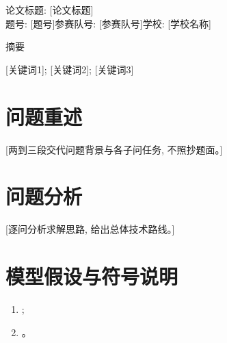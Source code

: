 \documentclass[zihao=-4,a4paper]{ctexart}
\begin{document}

\begin{center}
  {\Large\heiti 论文标题: [论文标题]}\\[0.3em]
  {\large 题号: [题号]\qquad 参赛队号: [参赛队号]\qquad 学校: [学校名称]}
\end{center}

\vspace{0.5em}

\begin{center}
  {\Large\heiti 摘\quad 要}
\end{center}


\vspace{1em}
 [关键词1]; [关键词2]; [关键词3]

\newpage


\section{问题重述}

[两到三段交代问题背景与各子问任务, 不照抄题面。]

\section{问题分析}

[逐问分析求解思路, 给出总体技术路线。]

\section{模型假设与符号说明}

\begin{enumerate}
  \item [假设 1 及其合理性依据];
  \item [假设 2 及其合理性依据]。
\end{enumerate}
\end{document}
